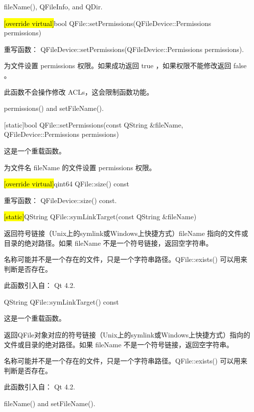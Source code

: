 \begin{notice}[另请参阅]
fileName(), QFileInfo, and QDir.
\end{notice}

\splitLine

\hl{[override virtual]}bool QFile::setPermissions(QFileDevice::Permissions permissions)

重写函数： QFileDevice::setPermissions(QFileDevice::Permissions permissions).

为文件设置 permissions 权限。如果成功返回 true ，如果权限不能修改返回 false 。



\begin{notice}[警告]
此函数不会操作修改 ACLs，这会限制函数功能。
\end{notice}

\begin{notice}[另请参阅]
permissions() and setFileName().
\end{notice}

\splitLine

[static]bool QFile::setPermissions(const QString \&fileName, QFileDevice::Permissions permissions)

这是一个重载函数。

为文件名 fileName 的文件设置 permissions 权限。

\hl{[override virtual]}qint64 QFile::size() const

重写函数： QFileDevice::size() const.

\splitLine

\hl{[static]}QString QFile::symLinkTarget(const QString \&fileName)

返回符号链接（Unix上的symlink或Windows上快捷方式）fileName 指向的文件或目录的绝对路径。如果 fileName 不是一个符号链接，返回空字符串。

名称可能并不是一个存在的文件，只是一个字符串路径。QFile::exists() 可以用来判断是否存在。

此函数引入自： Qt 4.2.

\splitLine

QString QFile::symLinkTarget() const

这是一个重载函数。

返回QFile对象对应的符号链接（Unix上的symlink或Windows上快捷方式）指向的文件或目录的绝对路径。如果 fileName 不是一个符号链接，返回空字符串。

名称可能并不是一个存在的文件，只是一个字符串路径。QFile::exists() 可以用来判断是否存在。

此函数引入自： Qt 4.2.

\begin{notice}[另请参阅]
fileName() and setFileName().
\end{notice}
